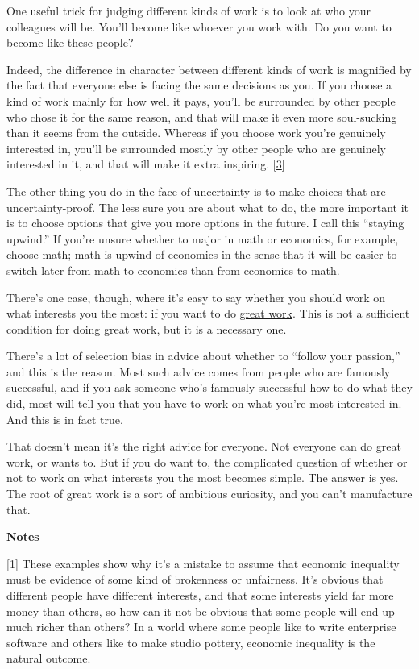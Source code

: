 One useful trick for judging different kinds of work is to look at who
your colleagues will be. You'll become like whoever you work with. Do
you want to become like these people?

Indeed, the difference in character between different kinds of work is
magnified by the fact that everyone else is facing the same decisions as
you. If you choose a kind of work mainly for how well it pays, you'll be
surrounded by other people who chose it for the same reason, and that
will make it even more soul-sucking than it seems from the outside.
Whereas if you choose work you're genuinely interested in, you'll be
surrounded mostly by other people who are genuinely interested in it,
and that will make it extra inspiring. {[}\hyperref[f3n]{3}{]}

The other thing you do in the face of uncertainty is to make choices
that are uncertainty-proof. The less sure you are about what to do, the
more important it is to choose options that give you more options in the
future. I call this ``staying upwind.'' If you're unsure whether to
major in math or economics, for example, choose math; math is upwind of
economics in the sense that it will be easier to switch later from math
to economics than from economics to math.

There's one case, though, where it's easy to say whether you should work
on what interests you the most: if you want to do
\href{greatwork.html}{great work}. This is not a sufficient condition
for doing great work, but it is a necessary one.

There's a lot of selection bias in advice about whether to ``follow your
passion,'' and this is the reason. Most such advice comes from people
who are famously successful, and if you ask someone who's famously
successful how to do what they did, most will tell you that you have to
work on what you're most interested in. And this is in fact true.

That doesn't mean it's the right advice for everyone. Not everyone can
do great work, or wants to. But if you do want to, the complicated
question of whether or not to work on what interests you the most
becomes simple. The answer is yes. The root of great work is a sort of
ambitious curiosity, and you can't manufacture that.

\textbf{Notes}

{[}1{]} These examples show why it's a mistake to assume that economic
inequality must be evidence of some kind of brokenness or unfairness.
It's obvious that different people have different interests, and that
some interests yield far more money than others, so how can it not be
obvious that some people will end up much richer than others? In a world
where some people like to write enterprise software and others like to
make studio pottery, economic inequality is the natural outcome.

